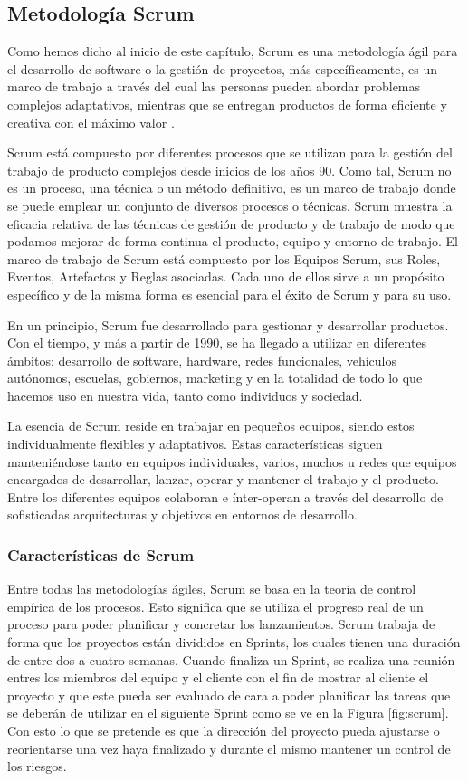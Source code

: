 \subsection{Metodología Scrum}

Como hemos dicho al inicio de este capítulo, Scrum es una metodología ágil para el desarrollo de software o la gestión de proyectos, más específicamente, es un marco de trabajo a través del cual las personas pueden abordar problemas complejos adaptativos, mientras que se entregan productos de forma eficiente y creativa con el máximo valor \cite{scrum-guia}.

Scrum está compuesto por diferentes procesos que se utilizan para la gestión del trabajo de producto complejos desde inicios de los años 90. Como tal, Scrum no es un proceso, una técnica o un método definitivo, es un marco de trabajo donde se puede emplear un conjunto de diversos procesos o técnicas. Scrum muestra la eficacia relativa de las técnicas de gestión de producto y de trabajo de modo que podamos mejorar de forma continua el producto, equipo y entorno de trabajo. El marco de trabajo de Scrum está compuesto por los Equipos Scrum, sus Roles, Eventos, Artefactos y Reglas asociadas. Cada uno de ellos sirve a un propósito específico y de la misma forma es esencial para el éxito de Scrum y para su uso.

En un principio, Scrum fue desarrollado para gestionar y desarrollar productos. Con el tiempo, y más a partir de 1990, se ha llegado a utilizar en diferentes ámbitos: desarrollo de software, hardware, redes funcionales, vehículos autónomos, escuelas, gobiernos, marketing y en la totalidad de todo lo que hacemos uso en nuestra vida, tanto como individuos y sociedad.

La esencia de Scrum reside en trabajar en pequeños equipos, siendo estos individualmente flexibles y adaptativos. Estas características siguen manteniéndose tanto en equipos individuales, varios, muchos u redes que equipos encargados de desarrollar, lanzar, operar y mantener el trabajo y el producto. Entre los diferentes equipos colaboran e ínter-operan a través del desarrollo de sofisticadas arquitecturas y objetivos en entornos de desarrollo.

\subsubsection{Características de Scrum}

Entre todas las metodologías ágiles, Scrum se basa en la teoría de control empírica de los procesos. Esto significa que se utiliza el progreso real de un proceso para poder planificar y concretar los lanzamientos. Scrum trabaja de forma que los proyectos están divididos en Sprints, los cuales tienen una duración de entre dos a cuatro semanas. Cuando finaliza un Sprint, se realiza una reunión entres los miembros del equipo y el cliente con el fin de mostrar al cliente el proyecto y que este pueda ser evaluado de cara a poder planificar las tareas que se deberán de utilizar en el siguiente Sprint como se ve en la Figura \ref{fig:scrum}. Con esto lo que se pretende es que la dirección del proyecto pueda ajustarse o reorientarse una vez haya finalizado y durante el mismo mantener un control de los riesgos.

